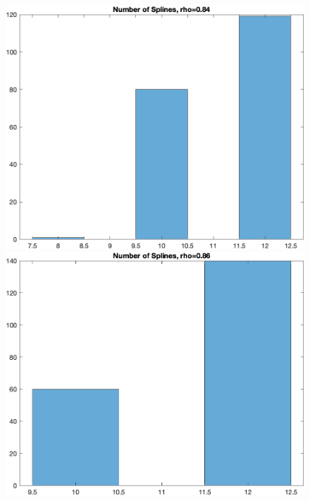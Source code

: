 \documentclass[
]{article}
\begin{document}
\begin{figure}
\begin{minipage}{0.50\linewidth}
\includegraphics{../figures/hist_n_spli_rho-0.84_finer_grid.png}\end{minipage}%
%
\begin{minipage}{0.50\linewidth}
\includegraphics{../figures/hist_n_spli_rho-0.86_finer_grid.png}\end{minipage}%
\newline
\begin{minipage}{0.50\linewidth}

\end{minipage}
\end{figure}
\end{document}
